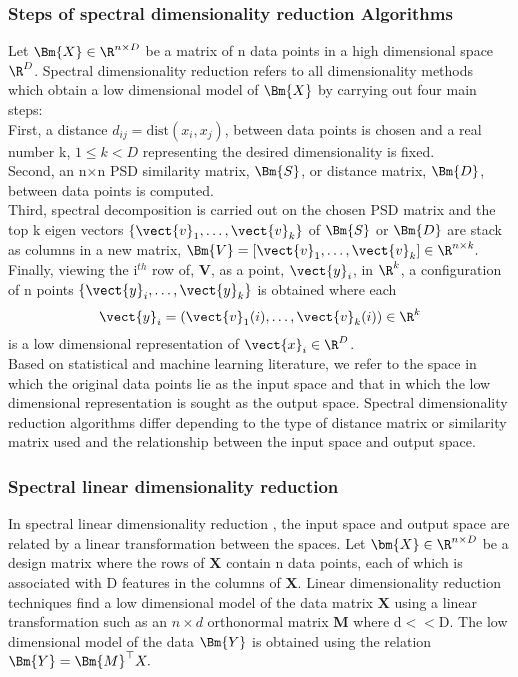 \subsubsection{Steps of spectral dimensionality reduction Algorithms}
Let $\Bm{X} \in \R^{n \times D}$ be a matrix of n data points in a high dimensional space $\R^{D}$. Spectral dimensionality reduction refers to all 
dimensionality methods which obtain a low dimensional model of $\Bm{X}$
by carrying out four main steps:\\
First, a distance $d_{ij} = \text{dist}(x_{i}, x_{j})$, between data points
is chosen and a real number k, $1 \leq k < D$ representing the desired dimensionality is fixed.\\
Second, an n$\times$n PSD similarity matrix, $\Bm{S}$, or distance matrix, $\Bm{D}$, between data points is computed.\\
Third, spectral decomposition is carried out on the chosen PSD matrix and
the top k eigen vectors $\{ \vect{v}_{1}, \ldots, \vect{v}_{k} \}$ of $\Bm{S}$
or $\Bm{D}$ are stack as columns in a new matrix, 
$\Bm{V} = [\vect{v}_{1}, \ldots, \vect{v}_{k}] \in \R^{n \times k}.$\\
Finally, viewing the i$^{th}$ row of, $\bm{V}$, as a point, $\vect{y}_{i}$,
in $\R^{k}$, a configuration of n points 
$\{\vect{y}_{i}, \ldots, \vect{y}_{k} \}$ is obtained where each
\[  
\vect{y}_{i} = (\vect{v}_{1}(i), \ldots, \vect{v}_{k}(i)) \in \R^{k}
\]
is a low dimensional representation of $\vect{x}_{i} \in \R^{D}$.\\


Based on statistical and machine learning literature, we refer to the space 
in which the original data points lie as the input space and that in which
the low dimensional representation is sought as the output space. 
Spectral dimensionality reduction algorithms differ depending to the
type of distance matrix or similarity matrix used and the relationship
between the input space and output space.



\subsubsection{Spectral linear dimensionality  reduction}
In spectral linear dimensionality reduction \cite{VanDerMaaten2009}, the input space and output space are related by a linear transformation between the spaces.
Let $\bm{X} \in \R^{n \times D}$ be a design matrix where the rows of
$\bm{X}$ contain n data points, each of which is associated with D features
in the columns of $\bm{X}$.
Linear dimensionality reduction techniques find a low dimensional model of the data matrix $\textbf{X}$ using a linear transformation such as an $n \times d$ orthonormal matrix \textbf{M} where d$<<$D. The low dimensional model of the data
$\Bm{Y}$ is obtained using the relation $\Bm{Y} = \Bm{M}^{\top}X.$ 



